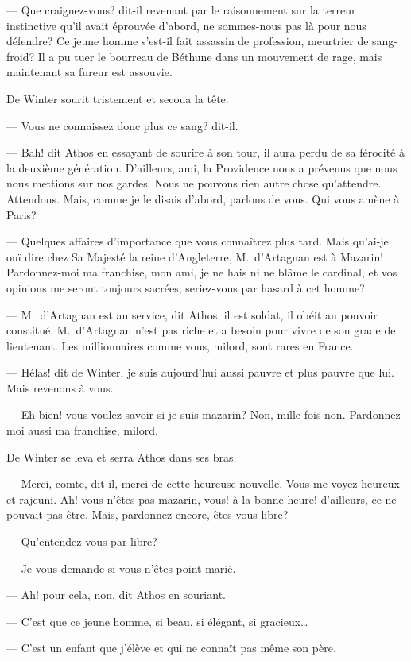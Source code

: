 — Que craignez-vous? dit-il revenant par le raisonnement sur la terreur instinctive qu'il avait éprouvée d'abord, ne sommes-nous pas là pour nous défendre? Ce jeune homme s'est-il fait assassin de profession, meurtrier de sang-froid? Il a pu tuer le bourreau de Béthune dans un mouvement de rage, mais maintenant sa fureur est assouvie.

De Winter sourit tristement et secoua la tête.

— Vous ne connaissez donc plus ce sang? dit-il.

— Bah! dit Athos en essayant de sourire à son tour, il aura perdu de sa férocité à la deuxième génération. D'ailleurs, ami, la Providence nous a prévenus que nous nous mettions sur nos gardes. Nous ne pouvons rien autre chose qu'attendre. Attendons. Mais, comme je le disais d'abord, parlons de vous. Qui vous amène à Paris?

— Quelques affaires d'importance que vous connaîtrez plus tard. Mais qu'ai-je ouï dire chez Sa Majesté la reine d'Angleterre, M.~d'Artagnan est à Mazarin! Pardonnez-moi ma franchise, mon ami, je ne hais ni ne blâme le cardinal, et vos opinions me seront toujours sacrées; seriez-vous par hasard à cet homme?

— M.~d'Artagnan est au service, dit Athos, il est soldat, il obéit au pouvoir constitué. M.~d'Artagnan n'est pas riche et a besoin pour vivre de son grade de lieutenant. Les millionnaires comme vous, milord, sont rares en France.

— Hélas! dit de Winter, je suis aujourd'hui aussi pauvre et plus pauvre que lui. Mais revenons à vous.

— Eh bien! vous voulez savoir si je suis mazarin? Non, mille fois non. Pardonnez-moi aussi ma franchise, milord.

De Winter se leva et serra Athos dans ses bras.

— Merci, comte, dit-il, merci de cette heureuse nouvelle. Vous me voyez heureux et rajeuni. Ah! vous n'êtes pas mazarin, vous! à la bonne heure! d'ailleurs, ce ne pouvait pas être. Mais, pardonnez encore, êtes-vous libre?

— Qu'entendez-vous par libre?

— Je vous demande si vous n'êtes point marié.

— Ah! pour cela, non, dit Athos en souriant.

— C'est que ce jeune homme, si beau, si élégant, si gracieux\dots

— C'est un enfant que j'élève et qui ne connaît pas même son père.

